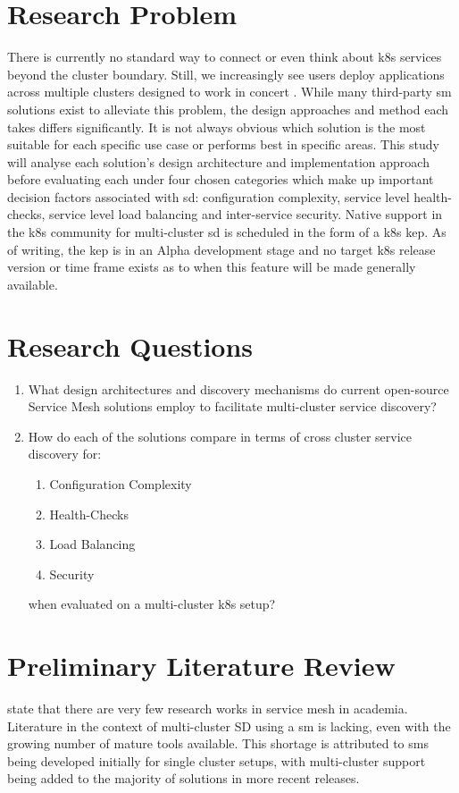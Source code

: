 \documentclass[12pt, a4paper, oneside]{article}
\begin{document}
\section{Research Problem}
There is currently no standard way to connect or even think about \acrshort{k8s} services beyond the cluster boundary. Still, we increasingly see users deploy applications across multiple clusters designed to work in concert \citep{kep}. While many third-party \acrshort{sm} solutions exist to alleviate this problem, the design approaches and method each takes differs significantly. It is not always obvious which solution is the most suitable for each specific use case or performs best in specific areas. This study will analyse each solution’s design architecture and implementation approach before evaluating each under four chosen categories which make up important decision factors associated with \acrshort{sd}: configuration complexity, service level health-checks, service level load balancing and inter-service security. Native support in the \acrshort{k8s} community for multi-cluster \acrshort{sd} is scheduled in the form of a \acrshort{k8s} \acrshort{kep}. As of writing, the \acrshort{kep} is in an Alpha development stage and no target \acrshort{k8s} release version or time frame exists as to when this feature will be made generally available.
\newpage

\section{Research Questions}
\begin{enumerate}
	\item What design architectures and discovery mechanisms do current open-source Service Mesh solutions employ to facilitate multi-cluster service discovery?
	\item How do each of the solutions compare in terms of cross cluster service discovery for:
	      \begin{enumerate}
	      	\item Configuration Complexity
	      	\item Health-Checks
	      	\item Load Balancing
	      	\item Security
	      \end{enumerate}
	      when evaluated on a multi-cluster \acrshort{k8s} setup?
\end{enumerate}
\newpage

\section{Preliminary Literature Review}
 \cite{servicemesh} state that there are very few research works in service mesh in academia. Literature in the context of multi-cluster SD using a \acrshort{sm} is lacking, even with the growing number of mature tools available. This shortage is attributed to \acrshort{sm}s being developed initially for single cluster setups, with multi-cluster support being added to the majority of solutions in more recent releases.
\end{document}

